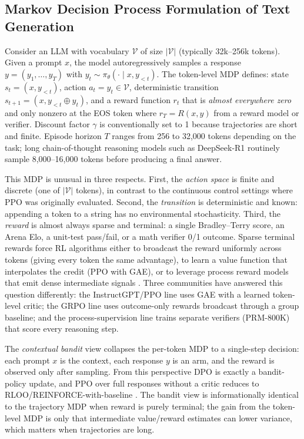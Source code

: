 \documentclass{article}
\begin{document}
\subsection{Markov Decision Process Formulation of Text Generation}\label{markov-decision-process-formulation-of-text-generation}

Consider an LLM with vocabulary \(\mathcal{V}\) of size \(|\mathcal{V}|\) (typically 32k--256k tokens). Given a prompt \(x\), the model autoregressively samples a response \(y = (y_1, \ldots, y_T)\) with \(y_t \sim \pi_\theta(\cdot \mid x, y_{<t})\). The token-level MDP defines: state \(s_t = (x, y_{<t})\), action \(a_t = y_t \in \mathcal{V}\), deterministic transition \(s_{t+1} = (x, y_{<t} \oplus y_t)\), and a reward function \(r_t\) that is \emph{almost everywhere zero} and only nonzero at the EOS token where \(r_T = R(x, y)\) from a reward model or verifier. Discount factor \(\gamma\) is conventionally set to 1 because trajectories are short and finite. Episode horizon \(T\) ranges from 256 to 32,000 tokens depending on the task; long chain-of-thought reasoning models such as DeepSeek-R1 routinely sample 8,000--16,000 tokens before producing a final answer.

This MDP is unusual in three respects. First, the \emph{action space} is finite and discrete (one of \(|\mathcal{V}|\) tokens), in contrast to the continuous control settings where PPO was originally evaluated. Second, the \emph{transition} is deterministic and known: appending a token to a string has no environmental stochasticity. Third, the \emph{reward} is almost always sparse and terminal: a single Bradley--Terry score, an Arena Elo, a unit-test pass/fail, or a math verifier 0/1 outcome. Sparse terminal rewards force RL algorithms either to broadcast the reward uniformly across tokens (giving every token the same advantage), to learn a value function that interpolates the credit (PPO with GAE), or to leverage process reward models that emit dense intermediate signals \citep{lightman2023letsverifystepbyst}. Three communities have answered this question differently: the InstructGPT/PPO line uses GAE with a learned token-level critic; the GRPO line uses outcome-only rewards broadcast through a group baseline; and the process-supervision line trains separate verifiers (PRM-800K) that score every reasoning step.

The \emph{contextual bandit} view collapses the per-token MDP to a single-step decision: each prompt \(x\) is the context, each response \(y\) is an arm, and the reward is observed only after sampling. From this perspective DPO \citep{rafailov2023directpreferenceop} is exactly a bandit-policy update, and PPO over full responses without a critic reduces to RLOO/REINFORCE-with-baseline \citep{ahmadian2024backtobasicsrevisi}. The bandit view is informationally identical to the trajectory MDP when reward is purely terminal; the gain from the token-level MDP is only that intermediate value/reward estimates can lower variance, which matters when trajectories are long.
\end{document}
